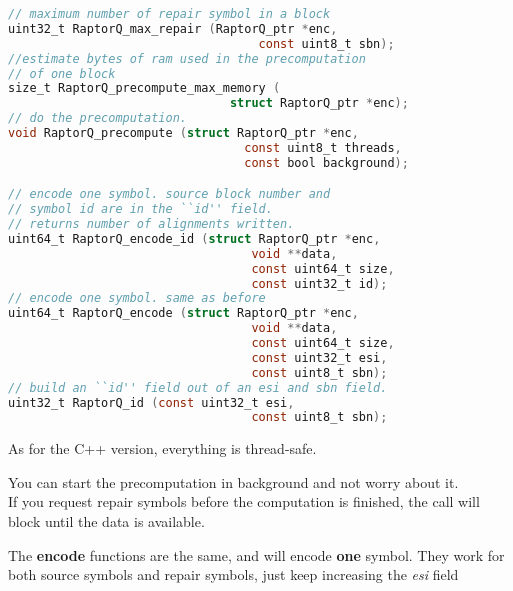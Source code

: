 \documentclass[11pt,a4paper]{refart}
\begin{document}
\begin{lstlisting}[language=C]
// maximum number of repair symbol in a block
uint32_t RaptorQ_max_repair (RaptorQ_ptr *enc,
                                   const uint8_t sbn);
//estimate bytes of ram used in the precomputation
// of one block
size_t RaptorQ_precompute_max_memory (
                               struct RaptorQ_ptr *enc);
// do the precomputation.
void RaptorQ_precompute (struct RaptorQ_ptr *enc,
                                 const uint8_t threads,
                                 const bool background);

// encode one symbol. source block number and
// symbol id are in the ``id'' field.
// returns number of alignments written.
uint64_t RaptorQ_encode_id (struct RaptorQ_ptr *enc,
                                  void **data,
                                  const uint64_t size,
                                  const uint32_t id);
// encode one symbol. same as before
uint64_t RaptorQ_encode (struct RaptorQ_ptr *enc,
                                  void **data,
                                  const uint64_t size,
                                  const uint32_t esi,
                                  const uint8_t sbn);
// build an ``id'' field out of an esi and sbn field.
uint32_t RaptorQ_id (const uint32_t esi,
                                  const uint8_t sbn);
\end{lstlisting}
As for the C++ version, everything is thread-safe.

You can start the precomputation in background and not worry about it.\\
If you request repair symbols before the computation is finished, the call will block until the data is available.

The \textbf{encode} functions are the same, and will encode \textbf{one} symbol.
They work for both source symbols and repair symbols, just keep increasing the \textit{esi} field


\newpage
\end{document}
